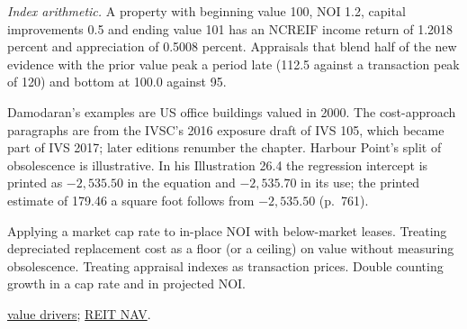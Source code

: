 \begin{qfmethod}
\emph{Index arithmetic.} A property with beginning value 100, NOI 1.2, capital improvements 0.5 and ending value 101 has an NCREIF income return of 1.2018 percent and appreciation of 0.5008 percent. Appraisals that blend half of the new evidence with the prior value peak a period late (112.5 against a transaction peak of 120) and bottom at 100.0 against 95.

 Damodaran's examples are US office buildings valued in 2000. The cost-approach paragraphs are from the IVSC's 2016 exposure draft of IVS 105, which became part of IVS 2017; later editions renumber the chapter. Harbour Point's split of obsolescence is illustrative. In his Illustration 26.4 the regression intercept is printed as $-2{,}535.50$ in the equation and $-2{,}535.70$ in its use; the printed estimate of 179.46 a square foot follows from $-2{,}535.50$ (p.~761).

 Applying a market cap rate to in-place NOI with below-market leases. Treating depreciated replacement cost as a floor (or a ceiling) on value without measuring obsolescence. Treating appraisal indexes as transaction prices. Double counting growth in a cap rate and in projected NOI.

 \hyperref[meth:real-estate-value-drivers]{value drivers}; \hyperref[meth:reit-valuation]{REIT NAV}.

\end{qfmethod}

